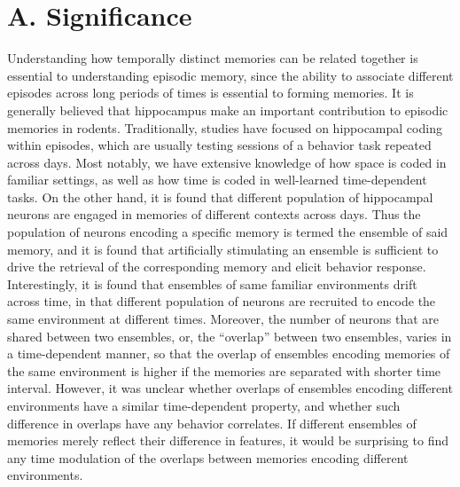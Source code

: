 \documentclass[master.tex]{subfiles}
\begin{document}
\section*{A. Significance}

Understanding how temporally distinct memories can be related together is
essential to understanding episodic memory, since the ability to associate
different episodes across long periods of times is essential to forming
memories. It is generally believed that hippocampus make an important
contribution to episodic memories in rodents. Traditionally, studies have
focused on hippocampal coding within episodes, which are usually testing
sessions of a behavior task repeated across days. Most notably, we have
extensive knowledge of how space is coded in familiar settings, as well as how
time is coded in well-learned time-dependent tasks. On the other hand, it is
found that different population of hippocampal neurons are engaged in memories
of different contexts across days. Thus the population of neurons encoding a
specific memory is termed the ensemble of said memory, and it is found that
artificially stimulating an ensemble is sufficient to drive the retrieval of the
corresponding memory and elicit behavior response. Interestingly, it is found
that ensembles of same familiar environments drift across time, in that
different population of neurons are recruited to encode the same environment at
different times. Moreover, the number of neurons that are shared between two
ensembles, or, the ``overlap'' between two ensembles, varies in a time-dependent
manner, so that the overlap of ensembles encoding memories of the same
environment is higher if the memories are separated with shorter time interval.
However, it was unclear whether overlaps of ensembles encoding different
environments have a similar time-dependent property, and whether such difference
in overlaps have any behavior correlates. If different ensembles of memories
merely reflect their difference in features, it would be surprising to find any
time modulation of the overlaps between memories encoding different
environments.
\end{document}
